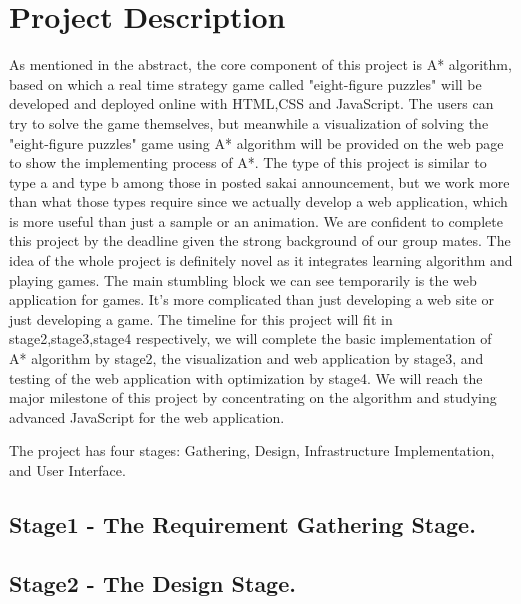 \documentclass[10pt,conference]{IEEEtran}
\begin{document}
\section{Project Description}\label{sec:1. Project Description}
\textnormal{
As mentioned in the abstract, the core component of this project is A* algorithm, based on which a real time strategy game called "eight-figure puzzles" will be developed and deployed online with HTML,CSS and JavaScript. The users can try to solve the game themselves, but meanwhile a visualization of solving the "eight-figure puzzles" game using A* algorithm will be provided on the web page to show the implementing process of A*. The type of this project is similar to type a and type b among those in posted sakai announcement, but we work more than what those types require since we actually develop a web application, which is more useful than just a sample or an animation. We are confident to complete this project by the deadline given the strong background of our group mates. The idea of the whole project is definitely novel as it integrates learning algorithm and playing games. The main stumbling block we can see temporarily is the web application for games. It's more complicated than just developing a web site or just developing a game. The timeline for this project will fit in stage2,stage3,stage4 respectively, we will complete the basic implementation of A* algorithm by stage2, the visualization and web application by stage3, and testing of the web application with optimization by stage4. We will reach the major milestone of this project by concentrating on the algorithm and studying advanced JavaScript for the web application.
}

The project has four stages: Gathering, Design, Infrastructure Implementation, and User Interface.

%
\subsection{Stage1 - The Requirement Gathering Stage. }\label{sec:1 Requirement Gathering Stage. }



\subsection{Stage2 - The Design Stage. }\label{sec: 2:The Design Stage.}

\end{document}
